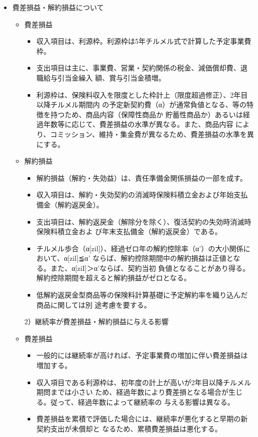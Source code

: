 \documentclass[report,gutter=10mm,fore-edge=10mm,uplatex,dvipdfmx]{jlreq}
\begin{document}
\begin{itemize}
\item[] 費差損益・解約損益について
\begin{itemize}
\item[] 費差損益
\begin{itemize}
\item[] 収入項目は、利源枠。利源枠は5年チルメル式で計算した予定事業費枠。
\item[] 支出項目は主に、事業費、営業・契約関係の税金、減価償却費、退職給与引当金繰入
額、賞与引当金積増。
\item[] 利源枠は、保険料収入を限度とした枠計上（限度超過修正）、2年目以降チルメル期間内
の予定新契約費（α）が通常負値となる、等の特徴を持つため、商品内容（保障性商品か
貯蓄性商品か）あるいは経過年数等に応じて、費差損益の水準が異なる。また、商品内容
により、コミッション、維持・集金費が異なるため、費差損益の水準を異にする。
\end{itemize}
\item[] 解約損益
\begin{itemize}
\item[] 解約損益（解約・失効益）は、責任準備金関係損益の一部を成す。
\item[] 収入項目は、解約・失効契約の消滅時保険料積立金および年始支払備金（解約返戻金）。
\item[] 支出項目は、解約返戻金（解除分を除く）、復活契約の失効時消滅時保険料積立金およ
び年末支払備金（解約返戻金）である。
\item[] チルメル歩合（α[zil]）、経過ゼロ年の解約控除率（α'）の大小関係において、α[zil]≦α'
ならば、解約控除期間中の解約損益は正値となる。また、α[ziI]＞α'ならば、契約当初
負値となることがあり得る。解約控除期間を超えると解約損益がゼロとなる。
\item[] 低解約返戻金型商品等の保険料計算基礎に予定解約率を織り込んだ商品に関しては別
途考慮を要する。
\end{itemize}
2）継続率が費差損益・解約損益に与える影響
\item[] 費差損益
\begin{itemize}
\item[] 一般的には継続率が高ければ、予定事業費の増加に伴い費差損益は増加する。
\item[] 収入項目である利源枠は、初年度の計上が高いが2年目以降チルメル期問までは小さい
ため、経過年数により費差損となる場合が生じる。従って、経過年数によって継続率の
与える影響は異なる。
\item[] 費差損益を累積で評価した場合には、継続率が悪化すると早期の新契約支出が未償却と
なるため、累積費差損益は悪化する。

\end{itemize}
\end{itemize}
\end{itemize}
\end{document}
